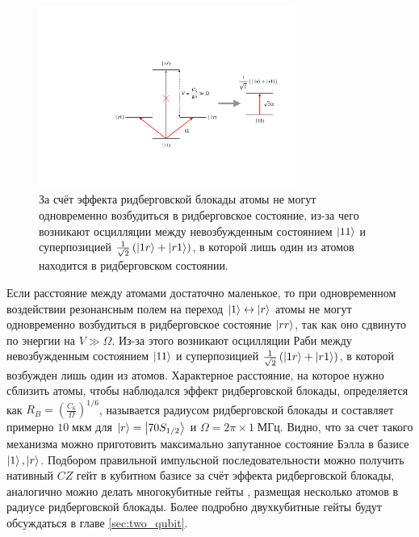 \begin{figure}
	\centering
	\includegraphics[width=0.75\textwidth]{images/rydberg_blockade_scheme.pdf}
	\caption{За счёт эффекта ридберговской блокады атомы не могут одновременно возбудиться в ридберговское состояние, из-за чего возникают осцилляции между невозбужденным состоянием $\left| 11 \right\rangle$ и суперпозицией $\frac{1}{\sqrt{2}}\left(\left| 1r \right\rangle + \left| r1 \right\rangle\right)$, в которой лишь один из атомов находится в ридберговском состоянии.}
	\label{fig:rydberg_blockade}
\end{figure}

Если расстояние между атомами достаточно маленькое, то при одновременном воздействии резонансным полем на переход $\left| 1 \right\rangle\leftrightarrow\left| r \right\rangle$ атомы не могут одновременно возбудиться в ридберговское состояние $\left| rr \right\rangle$, так как оно сдвинуто по энергии на $V \gg \Omega$. Из-за этого возникают осцилляции Раби между невозбужденным состоянием $\left| 11 \right\rangle$ и суперпозицией $\frac{1}{\sqrt{2}}\left(\left| 1r \right\rangle + \left| r1 \right\rangle\right)$, в которой возбужден лишь один из атомов. Характерное расстояние, на которое нужно сблизить атомы, чтобы наблюдался эффект ридберговской блокады, определяется как $R_B = \left(\frac{C_6}{\Omega}\right)^{1/6}$, называется радиусом ридберговской блокады и составляет примерно $10 \;\text{мкм}$ для $\left| r \right\rangle=\left| 70 S_{1/2} \right\rangle$ и $\Omega = 2\pi \times 1 \;\text{МГц}$. Видно, что за счет такого механизма можно приготовить максимально запутанное состояние Бэлла в базисе $\left| 1 \right\rangle, \left| r \right\rangle$. Подбором правильной импульсной последовательности можно получить нативный $CZ$ гейт в кубитном базисе за счёт эффекта ридберговской блокады, аналогично можно делать многокубитные гейты \cite{toffoli}, размещая несколько атомов в радиусе ридберговской блокады. Более подробно двухкубитные гейты будут обсуждаться в главе \ref{sec:two_qubit}.



